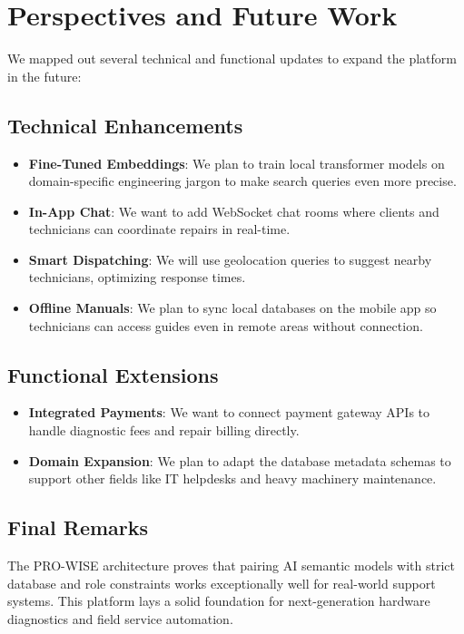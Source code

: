 \documentclass[12pt,a4paper]{report}
\begin{document}
\section*{Perspectives and Future Work}

We mapped out several technical and functional updates to expand the platform in the future:

\subsection*{Technical Enhancements}
\begin{itemize}
    \item \textbf{Fine-Tuned Embeddings}: We plan to train local transformer models on domain-specific engineering jargon to make search queries even more precise.
    \item \textbf{In-App Chat}: We want to add WebSocket chat rooms where clients and technicians can coordinate repairs in real-time.
    \item \textbf{Smart Dispatching}: We will use geolocation queries to suggest nearby technicians, optimizing response times.
    \item \textbf{Offline Manuals}: We plan to sync local databases on the mobile app so technicians can access guides even in remote areas without connection.
\end{itemize}

\subsection*{Functional Extensions}
\begin{itemize}
    \item \textbf{Integrated Payments}: We want to connect payment gateway APIs to handle diagnostic fees and repair billing directly.
    \item \textbf{Domain Expansion}: We plan to adapt the database metadata schemas to support other fields like IT helpdesks and heavy machinery maintenance.
\end{itemize}

\subsection*{Final Remarks}

The PRO-WISE architecture proves that pairing AI semantic models with strict database and role constraints works exceptionally well for real-world support systems. This platform lays a solid foundation for next-generation hardware diagnostics and field service automation.
\end{document}
